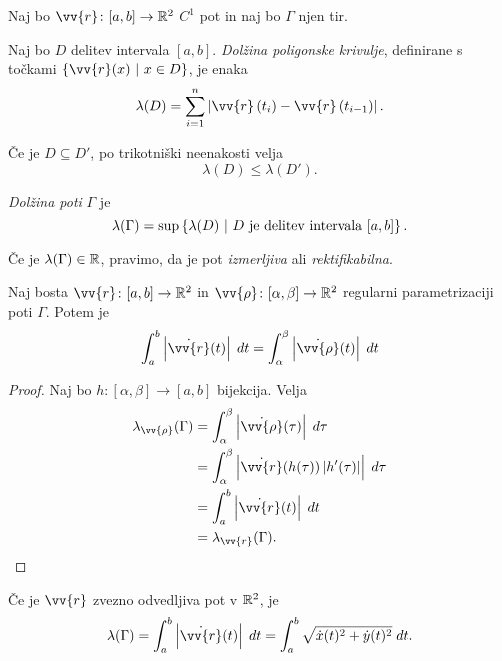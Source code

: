 \documentclass[12pt, a4paper]{article}
\begin{document}
Naj bo $\vv{r}\colon[a,b]\to\R^2$ $C^1$ pot in naj bo $\Gamma$ njen tir.

\begin{definicija}
Naj bo $D$ delitev intervala $[a,b]$. \emph{Dolžina poligonske krivulje}, definirane s točkami $\setb{\vv{r}(x)}{x\in D}$, je enaka
\[
\lambda(D)=\sum_{i=1}^n\abs{\vv{r}\left(t_i\right)-\vv{r}\left(t_{i-1}\right)}.
\]
\end{definicija}

\begin{opomba}
Če je $D\subseteq D'$, po trikotniški neenakosti velja
\[
\lambda(D)\leq\lambda(D').
\]
\end{opomba}

\begin{definicija}
\emph{Dolžina poti} $\Gamma$ je
\[
\lambda(\Gamma)=\sup\left\{\lambda(D)~\middle\vert~\text{$D$ je delitev intervala $[a,b]$}\right\}.
\]
\end{definicija}

\begin{opomba}
Če je $\lambda(\Gamma)\in\mathbb{R}$, pravimo, da je pot \emph{izmerljiva} ali \emph{rektifikabilna}.
\end{opomba}

\begin{izrek}
Naj bosta $\vv{r}\colon[a,b]\to\R^2$ in $\vv{\rho}\colon[\alpha,\beta]\to\R^2$ regularni parametrizaciji poti $\Gamma$. Potem je
\[
\int_a^b \abs{\dot{\vv{r}}(t)}\;dt=\int_\alpha^\beta \abs{\dot{\vv{\rho}}(t)}\;dt
\]
\end{izrek}

\begin{proof}
Naj bo $h\colon[\alpha,\beta]\to[a,b]$ bijekcija. Velja
\begin{align*}
\lambda_{\vv{\rho}}(\Gamma)&=\int_\alpha^\beta \abs{\dot{\vv{\rho}}(\tau)}\;d\tau
\\
&=\int_\alpha^\beta \abs{\Dot{\vv{r}}(h(\tau))\abs{h'(\tau)}}\;d\tau
\\
&=\int_a^b\abs{\dot{\vv{r}}(t)}\;dt
\\
&=\lambda_{\vv{r}}(\Gamma).
\end{align*}
\end{proof}

\begin{izrek}
Če je $\vv{r}$ zvezno odvedljiva pot v $\mathbb{R}^2$, je
\[
\lambda(\Gamma)=\int_a^b \abs{\dot{\vv{r}}(t)}\;dt=\int_a^b\sqrt{\dot{x}(t)^2+\dot{y}(t)^2}\;dt.
\]
\end{izrek}
\end{document}
